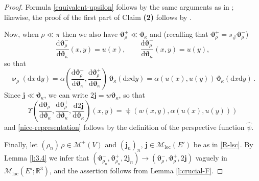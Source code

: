 \documentclass[11pt,reqno]{amsart}
\numberwithin{equation}{section}
\newcommand{\R}{\mathbb{R}}
\newcommand{\calM}{\mathcal{M}}
\newcommand{\dd}{\mathrm{d}}
\theoremstyle{definition}
\def\dd{\mathrm{d}}
\newcommand{\Cc}{\mathrm{C}_{\mathrm{c}}}
\newcommand{\teta}{\boldsymbol \vartheta}
\newcommand{\tetapi}{\boldsymbol{\teta}_{\kappa}}
\newcommand{\bnu}{\boldsymbol\upnu}
\newcommand{\bj}{{\boldsymbol j}}
\newcommand{\scrR}{\mathscr{R}}
\newcommand{\jj}{{\boldsymbol{j}}}
\newcommand{\Mloc}{\mathcal{M}_{\mathrm{loc}}}
\numberwithin{equation}{section}
\begin{document}
\begin{proof}
Formula \eqref{equivalent-upsilon} follows by the same arguments as in \cite[Sec.\ 4.2]{PRST22}; likewise, the proof of the first part of Claim \textbf{(2)}
follows by   \cite[Lemma 4.10]{PRST22}. 
\par
Now, 
when $\rho \ll \pi$ then we also have $\teta_\rho^\pm \ll \tetapi$ and (recalling that $\teta_\rho^+= s_{\#}\teta_\rho^-$)
\[
\frac{\dd \teta_\rho^-}{\dd \tetapi}(x,y) = u(x), \qquad \frac{\dd \teta_\rho^-}{\dd \tetapi}(x,y) = u(y),
\]
so that 
\[
\bnu_\rho(\dd x \, \dd y) = \alpha \left(\frac{\dd \teta_\rho^-}{\dd \tetapi},\frac{\dd \teta_\rho^+}{\dd \tetapi} \right) \,\tetapi(\dd x \dd y) = \alpha(u(x),u(y)) \,  \tetapi(\dd x \dd y) \,.
\]
Since
 $\bj\ll \tetapi$, we can write $2\jj = w \tetapi$, so that 
 \[
\Upsilon \left(\frac{\dd \teta_\rho^-}{\dd \tetapi} ,\frac{\dd \teta_\rho^+}{\dd \tetapi},\frac{\dd 2\jj}{\dd \tetapi} \right)(x,y) =\hat{\uppsi}(w(x,y),\alpha( u(x),u(y)))
\] 
  and \eqref{nice-representation} follows by the definition of the perspective function $\hat\psi$. 
  \par
  Finally, let $(\rho_n)\, \rho \in \calM^+(V)$ and $(\bj_n)_n,\, \bj \in \Mloc(E') $ be as in \eqref{R-lsc}. By Lemma \ref{l:3.4} we infer that
  $(\teta_{\rho_n}^-,\teta_{\rho_n}^+,2\bj_n) \to (\teta_\rho^-,\teta_\rho^+,2\bj)$ vaguely in $\Mloc(E';\R^3)$, and the  assertion follows 
  from Lemma \ref{l:crucial-F}.
\end{proof}


\end{document}
